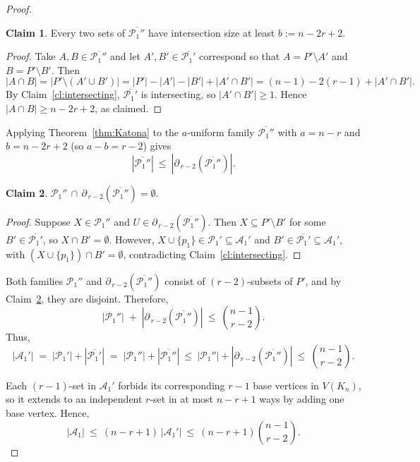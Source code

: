 \documentclass{article}
\theoremstyle{definition}
\newtheorem{claim}{Claim}
\newcommand{\A}{\mathcal{A}}
\newcommand{\1}{\mathbf{1}}
\begin{document}
\begin{proof}
\bigskip


\begin{claim}\label{cl:katona-parameters}
Every two sets of $\overline{\mathcal{P}_1''}$ have intersection size at least $b:=n-2r+2$.
\end{claim}
\begin{proof}
Take $A,B\in \overline{\mathcal{P}_1''}$ and let $A',B'\in \overline{\mathcal{P}_1'}$ correspond so that $A=P'\setminus A'$ and $B=P'\setminus B'$. Then
\[
|A\cap B| = |P'\setminus (A'\cup B')|
= |P'|-|A'|-|B'|+|A'\cap B'|
= (n-1)-2(r-1)+|A'\cap B'|.
\]
By Claim~\ref{cl:intersecting}, $\overline{\mathcal{P}_1'}$ is intersecting, so $|A'\cap B'|\ge 1$. Hence $|A\cap B|\ge n-2r+2$, as claimed.
\end{proof}

Applying Theorem~\ref{thm:Katona} to the $a$-uniform family $\overline{\mathcal{P}_1''}$ with $a=n-r$ and $b=n-2r+2$ (so $a-b=r-2$) gives
\[
|\overline{\mathcal{P}_1''}|\ \le\ |\partial_{\,r-2}(\overline{\mathcal{P}_1''})|.
\]

\bigskip

\begin{claim}\label{cl:disjoint}
$\mathcal{P}_1'' \,\cap\, \partial_{\,r-2}(\overline{\mathcal{P}_1''})=\emptyset$.
\end{claim}
\begin{proof}
Suppose $X\in \mathcal{P}_1''$ and $U\in \partial_{\,r-2}(\overline{\mathcal{P}_1''})$. Then $X\subseteq P'\setminus B'$ for some $B'\in \overline{\mathcal{P}_1'}$, so $X\cap B'=\emptyset$. However, $X\cup\{p_1\}\in \mathcal{P}_1'\subseteq \A_1'$ and $B'\in \overline{\mathcal{P}_1'}\subseteq \A_1'$, with $(X\cup\{p_1\})\cap B'=\emptyset$, contradicting Claim~\ref{cl:intersecting}.
\end{proof}

\bigskip

Both families $\mathcal{P}_1''$ and $\partial_{\,r-2}(\overline{\mathcal{P}_1''})$ consist of $(r-2)$-subsets of $P'$, and by Claim~\ref{cl:disjoint}, they are disjoint. Therefore,
\[
|\mathcal{P}_1''| \;+\; |\partial_{\,r-2}(\overline{\mathcal{P}_1''})|
\ \le\ \binom{n-1}{r-2}.
\]
Thus,
\[
|\A_1'| \;=\; |\mathcal{P}_1'|+|\overline{\mathcal{P}_1'}|
\;=\; |\mathcal{P}_1''|+|\overline{\mathcal{P}_1''}|
\ \le\ |\mathcal{P}_1''|+|\partial_{\,r-2}(\overline{\mathcal{P}_1''})|
\ \le\ \binom{n-1}{r-2}.
\]

Each $(r-1)$-set in $\A_1'$ forbids its corresponding $r-1$ base vertices in $V(K_n)$, so it extends to an independent $r$-set in at most $n-r+1$ ways by adding one base vertex. Hence,
\[
|\A_1|\ \le\ (n-r+1)\,|\A_1'|
\ \le\ (n-r+1)\binom{n-1}{r-2}.
\]


\end{proof}
\end{document}
